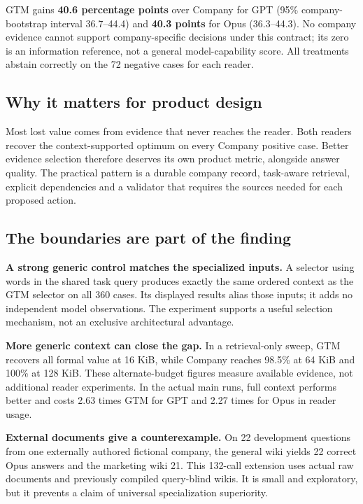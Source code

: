 \documentclass[
  11pt,
]{article}
\begin{document}
GTM gains \textbf{40.6 percentage points} over Company for GPT (95\%
company-bootstrap interval 36.7--44.4) and \textbf{40.3 points} for Opus
(36.3--44.3). No company evidence cannot support company-specific
decisions under this contract; its zero is an information reference, not
a general model-capability score. All treatments abstain correctly on
the 72 negative cases for each reader.

\subsection{Why it matters for product
design}\label{why-it-matters-for-product-design}

Most lost value comes from evidence that never reaches the reader. Both
readers recover the context-supported optimum on every Company positive
case. Better evidence selection therefore deserves its own product
metric, alongside answer quality. The practical pattern is a durable
company record, task-aware retrieval, explicit dependencies and a
validator that requires the sources needed for each proposed action.

\newpage

\subsection{The boundaries are part of the
finding}\label{the-boundaries-are-part-of-the-finding}

\textbf{A strong generic control matches the specialized inputs.} A
selector using words in the shared task query produces exactly the same
ordered context as the GTM selector on all 360 cases. Its displayed
results alias those inputs; it adds no independent model observations.
The experiment supports a useful selection mechanism, not an exclusive
architectural advantage.

\textbf{More generic context can close the gap.} In a retrieval-only
sweep, GTM recovers all formal value at 16 KiB, while Company reaches
98.5\% at 64 KiB and 100\% at 128 KiB. These alternate-budget figures
measure available evidence, not additional reader experiments. In the
actual main runs, full context performs better and costs 2.63 times GTM
for GPT and 2.27 times for Opus in reader usage.

\textbf{External documents give a counterexample.} On 22 development
questions from one externally authored fictional company, the general
wiki yields 22 correct Opus answers and the marketing wiki 21. This
132-call extension uses actual raw documents and previously compiled
query-blind wikis. It is small and exploratory, but it prevents a claim
of universal specialization superiority.
\end{document}
